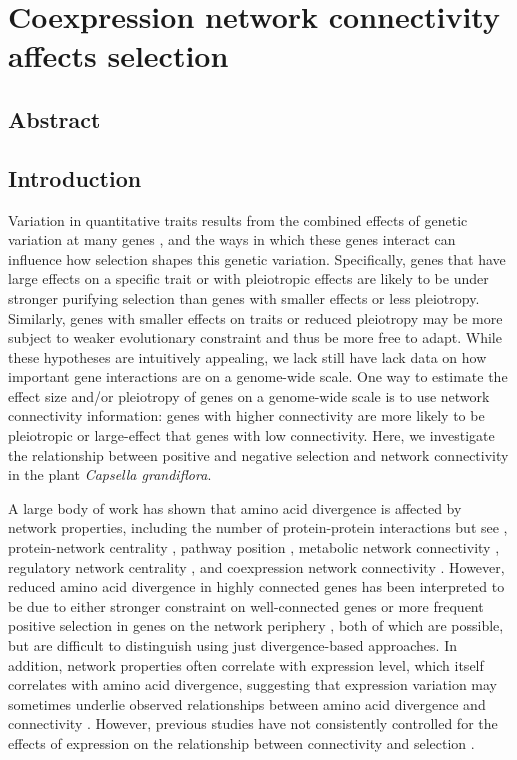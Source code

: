 \setlength{\parindent}{0ex}
\setlength{\parskip}{2ex}

\chapter{Coexpression network connectivity affects selection}

\section{Abstract}


\section{Introduction}

Variation in quantitative traits results from the combined effects of genetic variation at many genes \citep{lynch1998}, and the ways in which these genes interact can influence how selection shapes this genetic variation. Specifically, genes that have large effects on a specific trait or with pleiotropic effects are likely to be under stronger purifying selection than genes with smaller effects or less pleiotropy. Similarly, genes with smaller effects on traits or reduced pleiotropy may be more subject to weaker evolutionary constraint and thus be more free to adapt. While these hypotheses are intuitively appealing, we lack still have lack data on how important gene interactions are on a genome-wide scale. One way to estimate the effect size and/or pleiotropy of genes on a genome-wide scale is to use network connectivity information: genes with higher connectivity are more likely to be pleiotropic or large-effect that genes with low connectivity. Here, we investigate the relationship between positive and negative selection and network connectivity in the plant \textit{Capsella grandiflora}.

A large body of work has shown that amino acid divergence is affected by network properties, including the number of protein-protein interactions \citep{Fraser2002-rg,Lemos2005-io,Luisi2015-zz} but see \citep{Hahn2004-ke,Jordan2003-ri}, protein-network centrality \cite{Hahn2005-au}, pathway position \citep{Rausher1999-nk,Ramsay2009-vf,Eanes2011-on}, metabolic network connectivity \citep{Vitkup2006-bo}, regulatory network centrality \citep{Jovelin2009-tu}, and coexpression network connectivity \citep{Jordan2004-vj,Carlson2006-ai}. However, reduced amino acid divergence in highly connected genes has been interpreted to be due to either stronger constraint on well-connected genes \citep{Hahn2005-au,Ramsay2009-vf} or more frequent positive selection in genes on the network periphery \citep{Kim2007-xn,Luisi2015-zz}, both of which are possible, but are difficult to distinguish using just divergence-based approaches. In addition, network properties often correlate with expression level, which itself correlates with amino acid divergence, suggesting that expression variation may sometimes underlie observed relationships between amino acid divergence and connectivity \citep{Drummond2006-pa}. However, previous studies have not consistently controlled for the effects of expression on the relationship between connectivity and selection \citep{Jordan2004-vj,Fraser2002-rg}.

